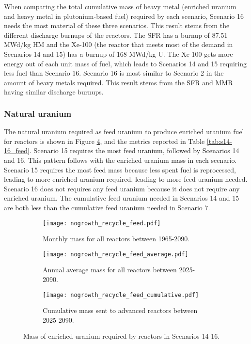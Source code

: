 When comparing the total cumulative mass of heavy metal (enriched 
uranium and heavy metal in plutonium-based fuel) required by each scenario,
Scenario 16 needs the most material of these three scenarios. This 
result stems from the different discharge burnups of the reactors. The 
\gls{SFR} has a burnup of 87.51 MWd/kg HM and the Xe-100 (the reactor that 
meets most of the demand in Scenarios 14 and 15) has a burnup of 168 MWd/kg U. 
The Xe-100 gets more energy out of each unit mass of fuel, which leads to 
Scenarios 14 and 15 requiring less fuel than Scenario 16. Scenario 16 is most 
similar to Scenario 2 in the amount of heavy metals required. This result 
stems from the \gls{SFR} and \gls{MMR} having similar discharge burnups.

\subsubsection{Natural uranium}
The natural uranium required as feed uranium to produce enriched 
uranium fuel for reactors is shown in Figure \ref{fig:nogrowth_recycle_feed}, 
and the metrics reported in Table \ref{tab:s14-16_feed}. Scenario 15 requires 
the most feed uranium, followed by Scenarios 14 and 16. This pattern follows 
with the enriched uranium mass in each scenario. Scenario 15 requires the 
most feed mass because less spent fuel is reprocessed, leading to more 
enriched uranium required, leading to more feed uranium needed. Scenario 
16 does not requires any feed uranium because it does not require any 
enriched uranium. The cumulative feed uranium needed in Scenarios 14 and 
15 are both less than the cumulative feed uranium needed in Scenario 7.

\begin{figure}[h!]
    \centering
    \begin{subfigure}[b]{0.45\textwidth}
        \centering
        \texttt{[image: nogrowth\_recycle\_feed.pdf]}
        \caption{Monthly mass 
        for all reactors between 1965-2090.}
        \label{fig:nogrowth_recycle_all_feed}
    \end{subfigure}
    \hfill
    \begin{subfigure}[b]{0.45\textwidth}
        \centering
        \texttt{[image: nogrowth\_recycle\_feed\_average.pdf]}
        \caption{Annual average  mass 
        for all reactors between 2025-2090.}
        \label{fig:nogrowth_recycle_AR_feed}
    \end{subfigure}
    \begin{subfigure}[b]{0.45\textwidth}
        \centering
        \texttt{[image: nogrowth\_recycle\_feed\_cumulative.pdf]}
        \caption{Cumulative mass sent to advanced reactors between 2025-2090.}
        \label{fig:nogrowth_recycle_feed_cumulative}
    \end{subfigure}
       \caption{Mass of enriched uranium required by reactors
        in Scenarios 14-16.}
       \label{fig:nogrowth_recycle_feed}
\end{figure}


